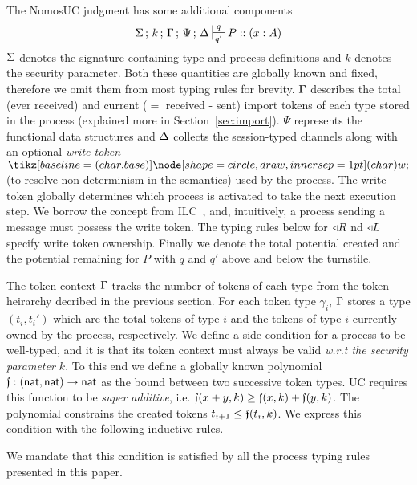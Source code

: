 The NomosUC judgment has some additional components
\[
\Sg \semi k \semi \Tokens \semi \Psi \semi \D \entailpot{q}{q'} P :: (x : A)
\]
$\Sigma$ denotes the signature containing type and process definitions and $k$
denotes the security parameter.
Both these quantities are globally known and fixed, therefore we omit them from
most typing rules for brevity.
$\Gamma$ describes the total (ever received) and current ($=$ received - sent) import tokens
of each type stored in the process (explained more in Section~\ref{sec:import}).
$\Psi$ represents the functional data structures and $\Delta$ collects the
session-typed channels along with an optional \emph{write token} $\wt$
(to resolve non-determinism in the semantics) used by the process. 
The write token globally determines which process is activated to take the next execution step.
We borrow the concept from ILC~\cite{ilc}, and, intuitively, a process sending a message must possess the write token. 
The typing rules below for $\triangleleft R$ nd $\triangleleft L$ specify write token ownership.
Finally we denote the total potential created and the potential remaining for $P$ with $q$ and $q'$ above and below the turnstile.

The token context $\Gamma$ tracks the number of tokens of each type from the token heirarchy decribed in the previous section.
For each token type $\gamma_i$, $\Gamma$ stores a type $(t_i,t_i')$ which are the total tokens of type $i$ and the tokens of type $i$ currently owned by the process, respectively. 
We define a side condition for a process to be well-typed, and it is that its token context must always be valid \emph{w.r.t the security parameter $k$}.
To this end we define a globally known polynomial $\mathfrak{f} : ({\mathsf {nat}}, {\mathsf {nat}}) \rightarrow {\mathsf {nat}}$ as the bound between two successive token types. UC requires this function to be \emph{super additive}, i.e. $\mathfrak{f}(x+y,k) \geq \mathfrak{f}(x,k) + \mathfrak{f}(y,k)$.
The polynomial constrains the created tokens $t_{i+1} \leq \mathfrak{f}(t_i, k)$.
We express this condition with the following inductive rules.
We mandate that this condition is satisfied by all the process typing rules presented in this paper.

